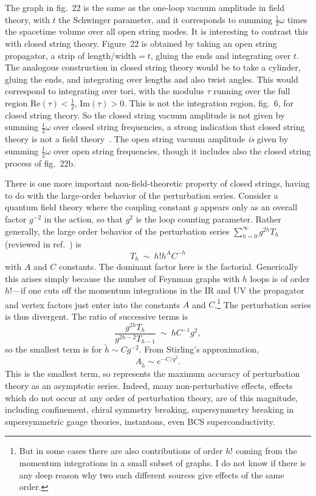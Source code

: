 The graph in fig.~22 is the same as the
one-loop vacuum amplitude in field theory, with $t$ the Schwinger
parameter, and it corresponds to summing 
$\frac{1}{2} \omega$ times the spacetime volume over all open string
modes.  It is interesting to contrast this with closed string theory.
Figure~22 is obtained by taking an open string propagator, a strip of
length/width$=t$, gluing the ends and integrating over $t$.  The
analogous construction in closed string theory would be to take a
cylinder, gluing the ends, and integrating over lengths and also
twist angles.  This would correspond to integrating over tori, with the
modulus $\tau$ running over the full region Re$(\tau) < \frac{1}{2}$,
Im$(\tau) > 0$.  This is not the integration region, fig.~6, for
closed string theory.  So the closed string vacuum amplitude is not
given by summing $\frac{1}{2} \omega$ over closed string frequencies,
a strong indication that closed 
string theory is not a field theory~\cite{Ptor}.
The open string vacuum amplitude {\it is} given by summing $\frac{1}{2}
\omega$ over open string frequencies, though it includes also the
closed string process of fig.~22b.

There is one more important non-field-theoretic property of closed
strings, having to do with the large-order behavior of the
perturbation series.  Consider a quantum field theory where the
coupling constant $g$ appears only as an overall factor $g^{-2}$ in
the action, so that $g^2$ is the loop counting parameter.  Rather
generally, the large order behavior of the perturbation
series $\sum_{h = 0}^\infty g^{2h} T_h$ (reviewed in
ref.~\cite{GZ-J}) is
\begin{equation}
T_h\ \sim\ h! h^A C^{-h} \label{hopt}
\end{equation}
with $A$ and $C$ constants.  The dominant factor here is the factorial.
Generically this arises simply because the number of Feynman graphs
with $h$ loops is of order $h!$---if one cuts off the momentum
integrations in the IR and UV the propagator and vertex factors just
enter into the constants $A$ and
$C$.\footnote{But in some cases there are also contributions of order
$h!$ coming from the momentum integrations in a small subset of graphs.
I do not know if there is any deep reason why two such different
sources give effects of the same order.}
The perturbation series is thus divergent.  The ratio of successive
terms is
\begin{equation}
\frac{g^{2h} T_h}{g^{2h-2} T_{h-1}} \ \sim\ h C^{-1} g^2,
\end{equation}
so the smallest term is for $\tilde h \sim Cg^{-2}$.  From
Stirling's approximation,
\begin{equation}
A_{\tilde h} \sim e^{-C/g^2}. \label{nptyp}
\end{equation}
This is the smallest term, so represents the maximum accuracy of
perturbation theory as an asymptotic series.  Indeed, many
non-perturbative effects, effects which do not occur at any order of
perturbation theory, are of this magnitude, including confinement,
chiral symmetry breaking, supersymmetry breaking in supersymmetric
gauge theories, instantons, even BCS superconductivity.

